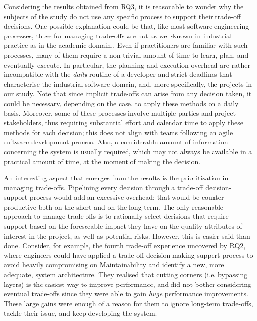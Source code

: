 Considering the results obtained from RQ3, it is reasonable to wonder why the subjects of the study do not use any specific process to support their trade-off decisions.
One possible explanation could be that, like most software engineering processes, those for managing trade-offs are not as well-known in industrial practice as in the academic domain..
Even if practitioners are familiar with such processes, many of them require a non-trivial amount of time to learn, plan, and eventually execute.
In particular, the planning and execution overhead are rather incompatible with the \textit{daily} routine of a developer and strict deadlines that characterise the industrial software domain, and, more specifically, the projects in our study. 
Note that since implicit trade-offs can arise from any decision taken, it could be necessary, depending on the case, to apply these methods on a daily basis.
Moreover, some of these processes involve multiple parties and project stakeholders, thus requiring substantial effort and calendar time to apply these methods for each decision; this does not align with teams following an agile software development process.
Also, a considerable amount of information concerning the system is usually required, which may not always be available in a practical amount of time, at the moment of making the decision.

An interesting aspect that emerges from the results is the prioritisation in managing trade-offs. Pipelining every decision through a trade-off decision-support process would add an excessive overhead; that would be counter-productive both on the short and on the long-term.
The only reasonable approach to manage trade-offs is to rationally select decisions that require support based on the foreseeable impact they have on the quality attributes of interest in the project, as well as potential risks. 
However, this is easier said than done.
Consider, for example, the fourth trade-off experience uncovered by RQ2, where engineers could have applied a trade-off decision-making support process to avoid heavily compromising on Maintainability and identify a new, more adequate, system architecture. 
They realised that cutting corners (i.e. bypassing layers) is the easiest way to improve performance, and did not bother considering eventual trade-offs since they were able to gain \textit{huge} performance improvements.
These large gains were enough of a reason for them to ignore long-term trade-offs, tackle their issue, and keep developing the system.


